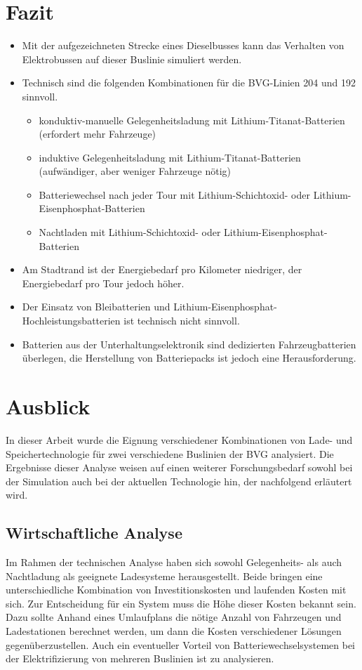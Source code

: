 \section{Fazit}
\begin{itemize}
	\item Mit der aufgezeichneten Strecke eines Dieselbusses kann das Verhalten von Elektrobussen auf dieser Buslinie simuliert werden.
	\item Technisch sind die folgenden Kombinationen für die BVG-Linien 204 und 192 sinnvoll.
	\begin{itemize} 
		\item konduktiv-manuelle Gelegenheitsladung mit Lithium-Titanat-Batterien (erfordert mehr Fahrzeuge)
		\item induktive Gelegenheitsladung mit Lithium-Titanat-Batterien (aufwändiger, aber weniger Fahrzeuge nötig)
		\item Batteriewechsel nach jeder Tour mit Lithium-Schichtoxid- oder Lithium-Eisenphosphat-Batterien
		\item Nachtladen mit Lithium-Schichtoxid- oder Lithium-Eisenphosphat-Batterien
	\end{itemize}
	\item Am Stadtrand ist der Energiebedarf pro Kilometer niedriger, der Energiebedarf pro Tour jedoch höher.
	\item Der Einsatz von Bleibatterien und Lithium-Eisenphosphat-Hochleistungsbatterien ist technisch nicht sinnvoll.
	\item Batterien aus der Unterhaltungselektronik sind dedizierten Fahrzeugbatterien überlegen, die Herstellung von Batteriepacks ist jedoch eine Herausforderung.
\end{itemize}

\section{Ausblick}
In dieser Arbeit wurde die Eignung verschiedener Kombinationen von Lade- und Speichertechnologie für zwei verschiedene Buslinien der BVG analysiert. Die Ergebnisse dieser Analyse weisen auf einen weiterer Forschungsbedarf sowohl bei der Simulation auch bei der aktuellen Technologie hin, der nachfolgend erläutert wird.

\subsection{Wirtschaftliche Analyse}
Im Rahmen der technischen Analyse haben sich sowohl Gelegenheits- als auch Nachtladung als geeignete Ladesysteme herausgestellt. Beide bringen eine unterschiedliche Kombination von Investitionskosten und laufenden Kosten mit sich. Zur Entscheidung für ein System muss die Höhe dieser Kosten bekannt sein. Dazu sollte Anhand eines Umlaufplans die nötige Anzahl von Fahrzeugen und Ladestationen berechnet werden, um dann die Kosten verschiedener Lösungen gegenüberzustellen. Auch ein eventueller Vorteil von Batteriewechselsystemen bei der Elektrifizierung von mehreren Buslinien ist zu analysieren.

